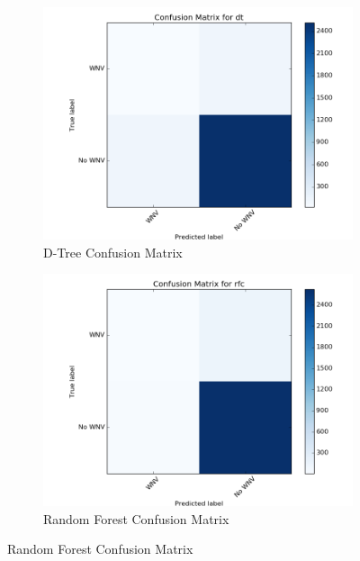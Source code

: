 \documentclass{article} %
\begin{document}
\begin{figure}
\begin{subfigure}[b]{.45\linewidth}
\includegraphics[width=\linewidth]{"img/dt-confusion"}
\caption{D-Tree Confusion Matrix}
\end{subfigure}
\begin{subfigure}[b]{.45\linewidth}
\includegraphics[width=\linewidth]{"img/rfc-confusion"}
\caption{Random Forest Confusion Matrix}
\end{subfigure}


\end{figure}
\end{document}

